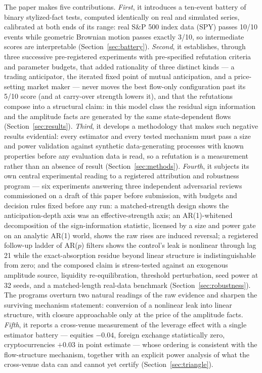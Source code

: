 \documentclass[11pt]{article}
\begin{document}
The paper makes five contributions. \emph{First}, it introduces a
ten-event battery of binary stylized-fact tests, computed identically on
real and simulated series, calibrated at both ends of its range: real S\&P
500 index data (SPY) passes 10/10 events while geometric Brownian motion
passes exactly 3/10, so intermediate scores are interpretable
(Section~\ref{sec:battery}). \emph{Second}, it establishes, through three
successive pre-registered experiments with pre-specified refutation
criteria and parameter budgets, that added rationality of three distinct
kinds ---
a trading anticipator, the iterated fixed point of mutual anticipation, and
a price-setting market maker --- never moves the best flow-only
configuration past its 5/10 score (and at carry-over strength lowers
it), and that the refutations compose into a
structural claim: in this model class the residual sign information and the
amplitude facts are generated by the same state-dependent flows
(Section~\ref{sec:results}). \emph{Third}, it develops a methodology that
makes such negative results evidential: every estimator and every tested
mechanism must pass a size and power validation against synthetic
data-generating processes with known properties before any evaluation data
is read, so a refutation is a measurement rather than an absence of result
(Section~\ref{sec:methods}). \emph{Fourth}, it subjects its own central
experimental reading to a registered attribution and robustness program
--- six experiments answering three independent adversarial reviews
commissioned on a draft of this paper before submission, with
budgets and decision rules fixed before any run: a matched-strength
design shows the anticipation-depth axis was an effective-strength axis;
an AR(1)-whitened decomposition of the sign-information statistic,
licensed by a size and power gate on an analytic AR(1) world, shows the
raw rises are induced reversal; a registered follow-up ladder of AR($p$)
filters shows the control's leak is nonlinear through lag 21 while the
exact-absorption residue beyond linear structure is indistinguishable
from zero; and the composed claim is
stress-tested against an exogenous amplitude source, liquidity
re-equilibration, threshold perturbation, seed power at 32 seeds, and a
matched-length real-data benchmark
(Section~\ref{sec:robustness}). The programs overturn two natural
readings of the raw evidence and sharpen the surviving mechanism
statement: conversion of a nonlinear leak into linear structure, with
closure approachable only at the price of the amplitude facts. \emph{Fifth}, it reports a
cross-venue measurement of the leverage effect with a single estimator
battery --- equities $-0.04$, foreign exchange statistically zero,
cryptocurrencies $+0.03$ in point estimate --- whose ordering is
consistent with the flow-structure mechanism, together with an explicit
power analysis of what the cross-venue data can and cannot yet certify
(Section~\ref{sec:triangle}).
\end{document}
